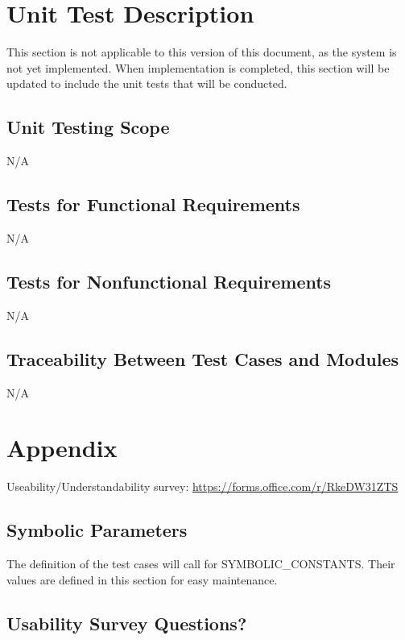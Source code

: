 \documentclass[12pt, titlepage]{article}
\begin{document}
\section{Unit Test Description}

This section is not applicable to this version of this document, as the system is not yet implemented.
When implementation is completed, this section will be updated to include the unit tests that will be conducted.

\subsection{Unit Testing Scope}
N/A

\subsection{Tests for Functional Requirements}
N/A

\subsection{Tests for Nonfunctional Requirements}
N/A

\subsection{Traceability Between Test Cases and Modules}
N/A	





\newpage

\section{Appendix}

Useability/Understandability survey:
\url{https://forms.office.com/r/RkeDW31ZTS}

\subsection{Symbolic Parameters}

The definition of the test cases will call for SYMBOLIC\_CONSTANTS.
Their values are defined in this section for easy maintenance.

\subsection{Usability Survey Questions?}
\end{document}
